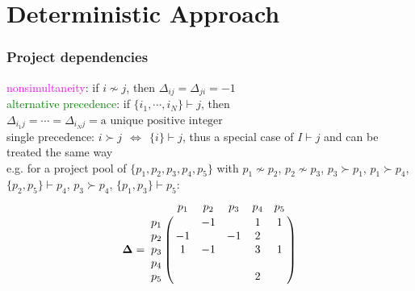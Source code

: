 \documentclass{beamer}
\newcommand{\tmag}{\textcolor{magenta}}
\newcommand{\tgreen}{\textcolor{green}}
\newcommand{\tcam}{\textcolor{blue!40}}
\begin{document}
	\section{Deterministic Approach}
		\begin{frame}
			\frametitle{Project dependencies}
			\tmag{nonsimultaneity}: if $i \nsim j$, then $\Delta_{ij}=\Delta_{ji}=-1$\\
			\smallskip
			\tgreen{alternative precedence}: if $\{i_1,\cdots,i_N\} \vdash j$, then $\Delta_{i_{1}j}=\cdots=\Delta_{i_{N}j}=\text{a unique positive integer}$\\
			\smallskip
			\tcam{single precedence}: $i \succ j~~\Leftrightarrow~~\{i\} \vdash j$, thus a special case of $I \vdash j$ and can be treated the same way\\
			\medskip
			e.g. for a project pool of $\{p_1,p_2,p_3,p_4,p_5\}$ with $p_1 \nsim p_2$, $p_2 \nsim p_3$, $p_3 \succ p_1$, $p_1 \succ p_4$, $\{p_2,p_5\} \vdash p_4$, $p_3 \succ p_4$, $\{p_1,p_3\} \vdash p_5$:\\
			\smallskip
			\begin{equation*}
				\boldsymbol{\Delta}=
				\bordermatrix{     & p_1 & p_2 & p_3 & p_4 & p_5\cr
				   p_1 &     &  -1 &     &  1  &  1 \cr
				   p_2 &  -1 &     & -1  &  2  &    \cr
				   p_3 &  1  & -1  &     &  3  &  1 \cr
				   p_4 &     &     &     &     &    \cr
				   p_5 &     &     &     &  2  &    }
			\end{equation*}
		\end{frame}
\end{document}
